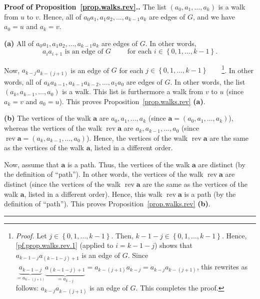 \documentclass[numbers=enddot,12pt,final,onecolumn,notitlepage]{scrartcl}%
\theoremstyle{definition}
\newenvironment{proof}[1][Proof]{\noindent\textbf{#1.} }{\ \rule{0.5em}{0.5em}}
\newcommand{\rev}{\operatorname{rev}}
\newcommand{\set}[1]{\left\{ #1 \right\}}
\newcommand{\tup}[1]{\left( #1 \right)}
\begin{document}
\begin{proof}[Proof of Proposition~\ref{prop.walks.rev}.]
The list $\tup{a_0, a_1, \ldots, a_k}$ is a walk from $u$ to $v$.
Hence, all of $a_0 a_1, a_1 a_2, \ldots, a_{k-1} a_k$ are edges of
$G$, and we have $a_0 = u$ and $a_k = v$.

\textbf{(a)} All of $a_0 a_1, a_1 a_2, \ldots, a_{k-1} a_k$ are edges
of $G$. In other words,
\begin{equation}
a_i a_{i+1} \text{ is an edge of } G
\qquad \text{ for each } i \in \set{0, 1, \ldots, k-1} .
\label{pf.prop.walks.rev.1}
\end{equation}

Now, $a_{k-j} a_{k-\tup{j+1}}$ is an edge of $G$ for each
$j \in \set{0, 1, \ldots, k-1}$\ \ \ \ \footnote{\textit{Proof.} Let
$j \in \set{0, 1, \ldots, k-1}$. Then,
$k-1-j \in \set{0, 1, \ldots, k-1}$. Hence,
\eqref{pf.prop.walks.rev.1} (applied to $i=k-1-j$) shows that
$a_{k-1-j} a_{\tup{k-1-j}+1}$ is an edge of $G$. Since
$\underbrace{a_{k-1-j}}_{= a_{k-\tup{j+1}}}
\underbrace{a_{\tup{k-1-j}+1}}_{= a_{k-j}}
= a_{k-\tup{j+1}} a_{k-j} = a_{k-j} a_{k-\tup{j+1}}$,
this rewrites as follows: $a_{k-j} a_{k-\tup{j+1}}$ is an edge of $G$.
This completes the proof.}. In other words, all of
$a_k a_{k-1}, a_{k-1} a_{k-2}, \ldots, a_1 a_0$ are edges of $G$.
In other words, the list $\tup{a_k, a_{k-1}, \ldots, a_0}$ is a walk.
This list is furthermore a walk from $v$ to $u$ (since $a_k = v$ and
$a_0 = u$). This proves Proposition~\ref{prop.walks.rev} \textbf{(a)}.

\textbf{(b)} The vertices of the walk $\mathbf{a}$ are
$a_0, a_1, \ldots, a_k$
(since $\mathbf{a} = \tup{a_0, a_1, \ldots, a_k}$),
whereas the vertices of the walk $\rev \mathbf{a}$ are
$a_k, a_{k-1}, \ldots, a_0$
(since $\rev \mathbf{a} = \tup{a_k, a_{k-1}, \ldots, a_0}$). Hence,
the vertices of the walk $\rev \mathbf{a}$ are the same as the
vertices of the walk $\mathbf{a}$, listed in a different order.

Now, assume that $\mathbf{a}$ is a path. Thus, the vertices of the
walk $\mathbf{a}$ are distinct (by the definition of ``path''). In
other words, the vertices of the walk $\rev \mathbf{a}$ are distinct
(since the vertices of the walk $\rev \mathbf{a}$ are the same as the
vertices of the walk $\mathbf{a}$, listed in a different order).
Hence, this walk $\rev \mathbf{a}$ is a path (by the definition of
``path''). This proves Proposition~\ref{prop.walks.rev} \textbf{(b)}.
\end{proof}
\end{document}
